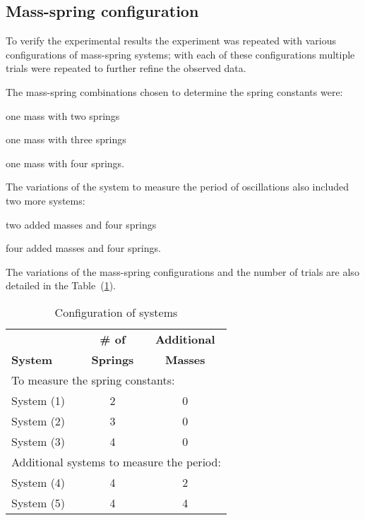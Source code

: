 \subsection{Mass-spring configuration}

To verify the experimental results the experiment was repeated with various configurations of mass-spring systems; with each of these configurations multiple trials were repeated to further refine the observed data.

The mass-spring combinations chosen to determine the spring constants were:
\begin{enumerate*}[label=\textit{\roman*}), 
       itemjoin={{; }},itemjoin*={{; and }}]
    \item one mass with two springs
    \item one mass with three springs
    \item one mass with four springs.
\end{enumerate*}
The variations of the system to measure the period of oscillations also included two more systems:
\begin{enumerate*}[label=\textit{\roman*}), 
       itemjoin={{; }},itemjoin*={{; and }}]
       \setcounter{enumi}{3}
    \item two added masses and four springs
    \item four added masses and four springs.
\end{enumerate*}

The variations of the mass-spring configurations and the number of trials are also detailed in the Table~(\ref{tab:table2}).


\begin{table}[!htb]
\begin{ruledtabular}
\begin{tabular}{lcc}
 \textbf{} & \textbf{\# of} & \textbf{Additional}\\
 \textbf{System} & \textbf{Springs} & \textbf{Masses}\\
\midrule
\multicolumn{3}{l}{To measure the spring constants:} \\
\midrule
System (1) & 2 & 0 \\
System (2) & 3 & 0\\
System (3) & 4 & 0 \\
\midrule
\multicolumn{3}{l}{Additional systems to measure the period:} \\
\midrule
System (4) & 4 & 2\\
System (5) & 4 & 4\\
\end{tabular}
\end{ruledtabular}
\caption{\centering\label{tab:table2}Configuration of systems}
\end{table}


